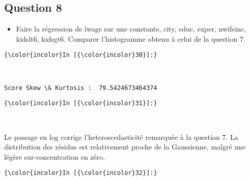 \documentclass[11pt]{article}
\providecommand{\tightlist}{%
      \setlength{\itemsep}{0pt}\setlength{\parskip}{0pt}}
\begin{document}
    \subsection{Question 8}\label{question-8}

\begin{itemize}
\tightlist
\item
  Faire la régression de lwage sur une constante, city, educ, exper,
  nwifeinc, kidslt6, kidsgt6. Comparer l'histogramme obtenu à celui de
  la question 7. 
\end{itemize}

    \begin{Verbatim}[commandchars=\\\{\}]
{\color{incolor}In [{\color{incolor}30}]:} 
\end{Verbatim}


    \begin{center}
    \end{center}
    { \hspace*{\fill} \\}
    
    \begin{Verbatim}[commandchars=\\\{\}]
Score Skew \& Kurtosis :  79.5424673464374

    \end{Verbatim}

    \begin{Verbatim}[commandchars=\\\{\}]
{\color{incolor}In [{\color{incolor}31}]:} 
\end{Verbatim}


    \begin{center}
    \end{center}
    { \hspace*{\fill} \\}
    
    Le passage en log corrige l'heteroscedasticité remarquée à la question
7. La distribution des résidus est relativement proche de la Gaussienne,
malgré une légère sur-concentration en zéro.

    \begin{Verbatim}[commandchars=\\\{\}]
{\color{incolor}In [{\color{incolor}32}]:} 
\end{Verbatim}
\end{document}
